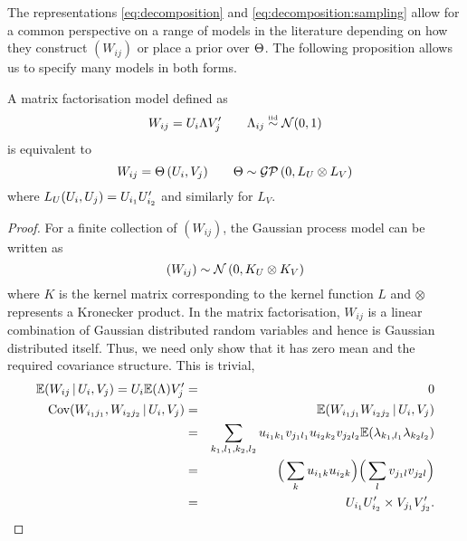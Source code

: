 The representations \eqref{eq:decomposition} and \eqref{eq:decomposition:sampling} allow for a common perspective on a range of models in the literature depending on how they construct $(W_{ij})$ or place a prior over $\Theta$.
The following proposition allows us to specify many models in both forms.

\begin{prop}
\label{prop:matrixfactorisation}
A matrix factorisation model defined as
\begin{equation}
W_{ij} = U_i\Lambda V_j' \quad \quad \Lambda_{ij} \overset{\mbox{\tiny iid}}{\sim} \mathcal{N} (0, 1)
\end{equation}
is equivalent to
\begin{equation}
W_{ij} = \Theta\,(U_i, V_j) \quad \quad \Theta \sim \mathcal{GP}\,(0, L_U \otimes L_V)
\end{equation}
where $L_U(U_i, U_j) = U_{i_1}U_{i_2}'$ and similarly for $L_V$.
\end{prop}

\begin{proof}
For a finite collection of $(W_{ij})$, the Gaussian process model can be written as
\begin{equation}
(W_{ij}) \sim \mathcal{N}\,(0, K_U \otimes K_V)
\end{equation}
where $K$ is the kernel matrix corresponding to the kernel function $L$ and $\otimes$ represents a Kronecker product.
In the matrix factorisation, $W_{ij}$ is a linear combination of Gaussian distributed random variables and hence is Gaussian distributed itself. Thus, we need only show that it has zero mean and the required covariance structure. This is trivial,
\begin{eqnarray}
\mathbb{E} (W_{ij} \,|\, U_i, V_j) = U_i\mathbb{E}(\Lambda)V_j' & = & 0 \\
\textrm{Cov} (W_{i_1j_1}, W_{i_2j_2} \,|\, U_i, V_j) & = & \mathbb{E} (W_{i_1j_1} W_{i_2j_2} \,|\, U_i, V_j ) \nonumber \\
& = & \sum_{k_1,l_1,k_2,l_2} u_{i_1k_1}v_{j_1l_1}u_{i_2k_2}v_{j_2l_2}\mathbb{E}(\lambda_{k_1,l_1}\lambda_{k_2l_2}) \nonumber \\
& = & \Big(\sum_k u_{i_1k}u_{i_2k}\Big)\Big(\sum_l v_{j_1l}v_{j_2l}\Big) \nonumber \\
& = & U_{i_1}U_{i_2}' \times V_{j_1}V_{j_2}'.
\end{eqnarray}
\end{proof}

